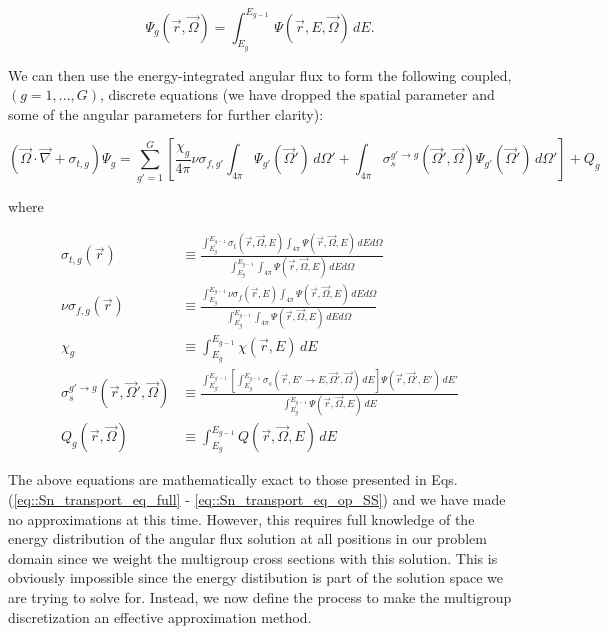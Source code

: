 \begin{equation}
\label{eq::Sn_MG_ang_flux_g}
\Psi_g (\vec{r}, \vec{\Omega}) = \int_{E_g}^{E_{g-1}} \, \Psi (\vec{r}, E, \vec{\Omega}) \, dE .
\end{equation}

\noindent We can then use the energy-integrated angular flux to form the following coupled, $(g=1,...,G)$, discrete equations (we have dropped the spatial parameter and some of the angular parameters for further clarity):

\begin{equation}
\label{eq::Sn_MG_trans_eq}
\left(  \vec{\Omega} \cdot \vec{\nabla} + \sigma_{t,g}  \right) \Psi_g =  \sum_{g'=1}^{G} \left[ \frac{\chi_g}{4 \pi} \nu \sigma_{f,g'} \int_{4 \pi} \Psi_{g'} (\vec{\Omega}') \, d\Omega' + \int_{4 \pi} \sigma_{s}^{g' \rightarrow g} (\vec{\Omega}' , \vec{\Omega} ) \Psi_{g'} (\vec{\Omega}')  \, d\Omega'  \right] + Q_g
\end{equation}

\noindent where

\begin{equation}
\label{eq::Sn_MG_exact_condensed_terms}
\begin{aligned}
\sigma_{t,g} (\vec{r}) & \equiv \frac{\int_{E_{g}}^{E_{g-1}} \sigma_{t} (\vec{r},\vec{\Omega},E) \int_{4 \pi} \Psi (\vec{r},\vec{\Omega}, E) \, dE d\Omega}{\int_{E_{g}}^{E_{g-1}} \int_{4 \pi} \Psi (\vec{r},\vec{\Omega}, E) \, dE d\Omega}\\
\nu\sigma_{f,g} (\vec{r}) & \equiv \frac{\int_{E_{g}}^{E_{g-1}} \nu\sigma_{f} (\vec{r},E)  \int_{4 \pi} \Psi (\vec{r},\vec{\Omega}, E) \, dE d\Omega}{\int_{E_{g}}^{E_{g-1}} \int_{4 \pi} \Psi (\vec{r},\vec{\Omega}, E) \, dE d\Omega} \\
\chi_g & \equiv \int_{E_{g}}^{E_{g-1}} \chi  (\vec{r},E) \, dE \\
\sigma_{s}^{g' \rightarrow g} (\vec{r},\vec{\Omega}' , \vec{\Omega} ) & \equiv \frac{\int_{E_{g'}}^{E_{g'-1}} \left[ \int_{E_{g}}^{E_{g-1}} \sigma_s (\vec{r},E' \rightarrow E,\vec{\Omega}' , \vec{\Omega} ) \, dE \right] \Psi (\vec{r},\vec{\Omega}', E') \, dE' }{\int_{E_{g}}^{E_{g-1}}  \Psi (\vec{r},\vec{\Omega}, E) \, dE} \\
Q_g (\vec{r}, \vec{\Omega}) & \equiv \int_{E_{g}}^{E_{g-1}} Q (\vec{r}, \vec{\Omega}, E) \, dE
\end{aligned}
\end{equation}

The above equations are mathematically exact to those presented in Eqs. (\ref{eq::Sn_transport_eq_full} - \ref{eq::Sn_transport_eq_op_SS}) and we have made no approximations at this time. However, this requires full knowledge of the energy distribution of the angular flux solution at all positions in our problem domain since we weight the multigroup cross sections with this solution. This is obviously impossible since the energy distibution is part of the solution space we are trying to solve for. Instead, we now define the process to make the multigroup discretization an effective approximation method.

